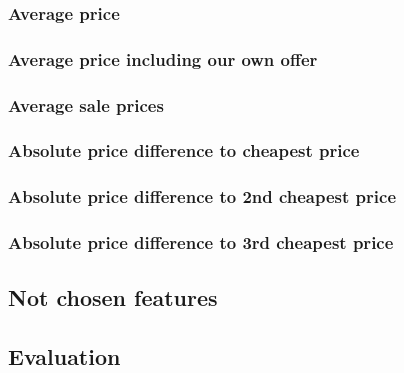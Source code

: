 \subsubsection{Average price}
\subsubsection{Average price including our own offer}
\subsubsection{Average sale prices}
\subsubsection{Absolute price difference to cheapest price}
\subsubsection{Absolute price difference to 2nd cheapest price}
\subsubsection{Absolute price difference to 3rd cheapest price}
\subsection{Not chosen features}
\subsection{Evaluation}

